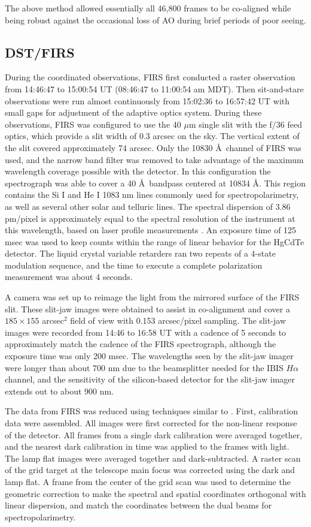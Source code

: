 \documentclass[twocolumn]{aastex62}
\newcommand{\halpha}{\ensuremath{H\alpha}}
\begin{document}
The above method allowed essentially all 46,800 frames to be co-aligned while being robust against the occasional loss of AO during brief periods of poor seeing.\par

\subsection{DST/FIRS}
During the coordinated observations, FIRS first conducted a raster observation from 14:46:47 to 15:00:54 UT (08:46:47 to 11:00:54 am MDT).  Then sit-and-stare observations were run almost continuously from 15:02:36 to 16:57:42 UT with small gaps for adjustment of the adaptive optics system.  During these observations, FIRS was configured to use the 40 $\mu$m single slit with the f/36 feed optics, which provide a slit width of 0.3 arcsec on the sky.  The vertical extent of the slit covered approximately 74 arcsec.  Only the 10830 \AA\ channel of FIRS was used, and the narrow band filter was removed to take advantage of the maximum wavelength coverage possible with the detector.  In this configuration the spectrograph was able to cover a 40 \AA\ bandpass centered at 10834 \AA.  This region contains the Si I and He I 1083 nm lines commonly used for spectropolarimetry, as well as several other solar and telluric lines.  The spectral dispersion of 3.86 pm/pixel is approximately equal to the spectral resolution of the instrument at this wavelength, based on laser profile measurements \citep{2011Jaeggli_PHD}.  An exposure time of 125 msec was used to keep counts within the range of linear behavior for the HgCdTe detector.  The liquid crystal variable retarders ran two repeats of a 4-state modulation sequence, and the time to execute a complete polarization measurement was about 4 seconds.

A camera was set up to reimage the light from the mirrored surface of the FIRS slit.  These slit-jaw images were obtained to assist in co-alignment and cover a $185\times155$ arcsec$^2$ field of view with 0.153 arcsec/pixel sampling.  The slit-jaw images were recorded from 14:46 to 16:58 UT with a cadence of 5 seconds to approximately match the cadence of the FIRS spectrograph, although the exposure time was only 200 msec.  The wavelengths seen by the slit-jaw imager  were longer than about 700 nm due to the beamsplitter needed for the IBIS \halpha{} channel, and the sensitivity of the silicon-based detector for the slit-jaw imager extends out to about 900 nm.

The data from FIRS was reduced using techniques similar to \citet{2012Jaegglietal}.  First, calibration data were assembled.  All images were first corrected for the non-linear response of the detector.  All frames from a single dark calibration were averaged together, and the nearest dark calibration in time was applied to the frames with light.  The lamp flat images were averaged together and dark-subtracted.  A raster scan of the grid target at the telescope main focus was corrected using the dark and lamp flat.  A frame from the center of the grid scan was used to determine the geometric correction to make the spectral and spatial coordinates orthogonal with linear dispersion, and match the coordinates between the dual beams for spectropolarimetry.
\end{document}
